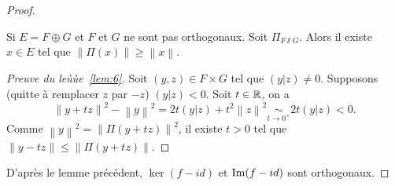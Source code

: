\documentclass[12pt]{article}
\begin{document}
\begin{proof}
	\begin{lemma}
		\label{lem:6}
		Si $E=F\oplus G$ et $F$ et $G$ ne sont pas orthogonaux. Soit $\Pi_{F\sslash G}$. Alors il existe $x\in E$ tel que $\left\lVert \Pi(x)\right\rVert\geqslant\left\lVert x\right\rVert$.
	\end{lemma}
	\begin{proof}[Preuve du leùùe~\ref{lem:6}]
		Soit $(y,z)\in F\times G$ tel que $(y|z)\neq0$. Supposons (quitte à remplacer $z$ par $-z$) $(y|z)<0$. Soit $t\in\mathbb{R}$, on a 
		\begin{equation}
			\left\lVert y+tz\right\rVert^{2}-\left\lVert y\right\rVert^{2}=2t(y|z)+t^{2}\left\lVert z\right\rVert^{2}\underset{t\to0^{+}}{\sim}2t(y|z)<0.
		\end{equation}
		Comme $\left\lVert y\right\rVert^{2}=\left\lVert\Pi(y+tz)\right\rVert^{2}$, il existe $t>0$ tel que $\left\lVert y-tz\right\rVert\leqslant\left\lVert\Pi(y+tz)\right\rVert$.
	\end{proof}

	D'après le lemme précédent, $\ker(f-id)$ et $\mathrm{Im}(f-id)$ sont orthogonaux.
\end{proof}
\end{document}
